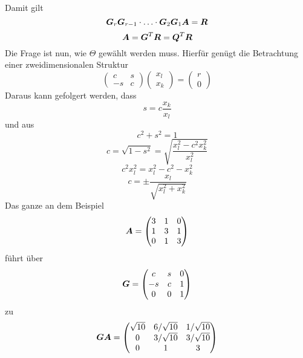 Damit gilt
\begin{equation}
	\boldsymbol {G}_r \boldsymbol {G}_{r - 1} \cdot \ldots \cdot \boldsymbol {G}_2 \boldsymbol {G}_1 \boldsymbol {A} = \boldsymbol {R}
\end{equation}
\begin{equation}
	\boldsymbol {A} = \boldsymbol {G}^T \boldsymbol {R} = \boldsymbol {Q}^T \boldsymbol {R}
\end{equation}
Die Frage ist nun, wie $\Theta$ gewählt werden muss. Hierfür genügt die Betrachtung einer zweidimensionalen Struktur
\begin{equation}
	\begin{pmatrix}
		c & s \\
		-s & c
	\end{pmatrix} 
	\begin{pmatrix}
		x_l \\
		x_k
	\end{pmatrix} = 
	\begin{pmatrix}
		r \\
		0
	\end{pmatrix}
\end{equation}
Daraus kann gefolgert werden, dass
\begin{equation}
	s = c \frac{x_k}{x_l}
\end{equation}
und aus
\begin{equation}
	c^2 + s^2 = 1
\end{equation}
\begin{equation}
	c = \sqrt{1 - s^2} = \sqrt{\frac{x_l^2 - c^2 x_k^2}{x_l^2}}
\end{equation}
\begin{equation}
	c^2 x_l^2 = x_l^2 - c^2 - x_k^2
\end{equation}
\begin{equation}
	c = \pm \frac{x_l}{\sqrt{x_l^2 + x_k^2}}
\end{equation}
Das ganze an dem Beispiel
\begin{equation}
	\boldsymbol {A} = 
	\begin{pmatrix}
		3 & 1 & 0 \\
		1 & 3 & 1 \\
		0 & 1 & 3	
	\end{pmatrix}
\end{equation}
führt über
\begin{equation}
	\boldsymbol {G} = 
	\begin{pmatrix}
		c & s & 0 \\
		-s & c & 1 \\
		0 & 0 & 1	
	\end{pmatrix}
\end{equation}
zu
\begin{equation}
	\boldsymbol {G} \boldsymbol {A} =
	\begin{pmatrix}
		\sqrt{10} & 6/\sqrt{10} & 1/\sqrt{10} \\
		0 & 3/\sqrt{10} & 3/\sqrt{10} \\
		0 & 1 & 3	
	\end{pmatrix}
\end{equation} 
